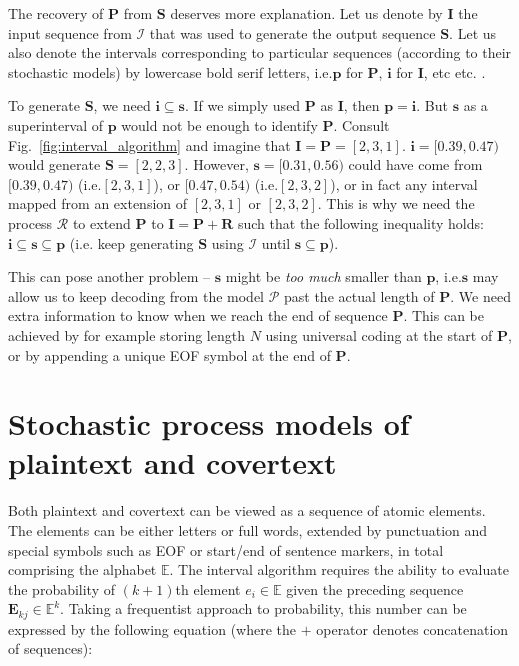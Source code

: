\documentclass[12pt,twoside,a4paper]{article}
\makeatletter
\newcommand*{\ie}{i.e.\@\xspace}
\newcommand*{\etc}{%
    \@ifnextchar{.}%
        {etc}%
        {etc.\@\xspace}%
}
\makeatother
\begin{document}
The recovery of $\mathbf P$ from $\mathbf S$ deserves more explanation. Let us denote by $\mathbf I$ the input sequence from $\mathcal I$ that was used to generate the output sequence $\mathbf S$. Let us also denote the intervals corresponding to particular sequences (according to their stochastic models) by lowercase bold serif letters, \ie $\mathbf p$ for $\mathbf P$, $\mathbf i$ for $\mathbf I$, \etc.

To generate $\mathbf S$, we need $\mathbf i \subseteq \mathbf s$. If we simply used $\mathbf P$ as $\mathbf I$, then $\mathbf p = \mathbf i$. But $\mathbf s$ as a superinterval of $\mathbf p$ would not be enough to identify $\mathbf P$. Consult Fig.~\ref{fig:interval_algorithm} and imagine that $\mathbf I = \mathbf P = [2,3,1]$. $\mathbf i = [0.39,0.47)$ would generate $\mathbf S = [2,2,3]$. However, $\mathbf s = [0.31,0.56)$ could have come from $[0.39,0.47)$ (\ie $[2,3,1]$), or $[0.47,0.54)$ (\ie $[2,3,2]$), or in fact any interval mapped from an extension of $[2,3,1]$ or $[2,3,2]$. This is why we need the process $\mathcal R$ to extend $\mathbf P$ to $\mathbf I = \mathbf P + \mathbf R$ such that the following inequality holds: $\mathbf i \subseteq \mathbf s \subseteq \mathbf p$ (\ie keep generating $\mathbf S$ using $\mathcal I$ until $\mathbf s \subseteq \mathbf p$).

This can pose another problem -- $\mathbf s$ might be \emph{too much} smaller than $\mathbf p$, \ie $\mathbf s$ may allow us to keep decoding from the model $\mathcal P$ past the actual length of $\mathbf P$. We need extra information to know when we reach the end of sequence $\mathbf P$. This can be achieved by for example storing length $N$ using universal coding at the start of $\mathbf P$, or by appending a unique EOF symbol at the end of $\mathbf P$.

\section{Stochastic process models of plaintext and covertext}

Both plaintext and covertext can be viewed as a sequence of atomic elements. The elements can be either letters or full words, extended by punctuation and special symbols such as EOF or start/end of sentence markers, in total comprising the alphabet $\mathbb E$. The interval algorithm requires the ability to evaluate the probability of $(k+1)$th element $e_i \in \mathbb E$ given the preceding sequence $\mathbf E_{kj} \in \mathbb E^k$. Taking a frequentist approach to probability, this number can be expressed by the following equation (where the $+$ operator denotes concatenation of sequences):
\end{document}
